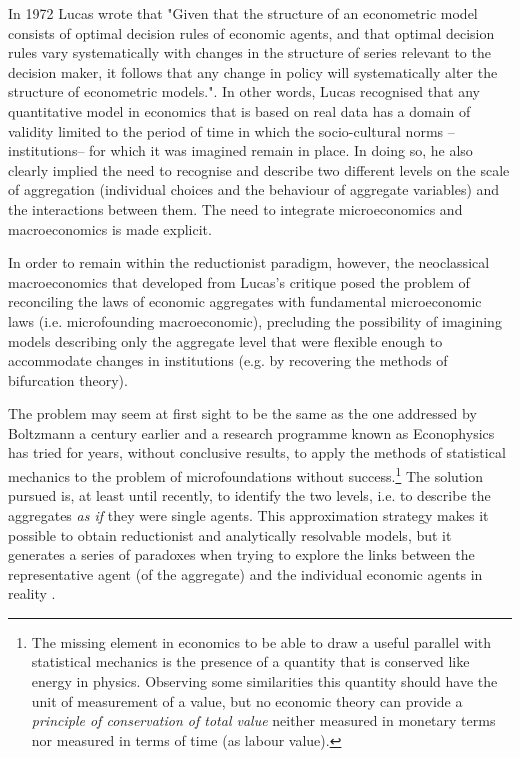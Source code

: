 \documentclass[a4paper, headings=standardclasses]{scrartcl}
\begin{document}
In 1972 Lucas wrote that "Given that the structure of an econometric model consists of optimal decision rules of economic agents, and that optimal decision rules vary systematically with changes in the structure of series relevant to the decision maker, it follows that any change in policy will systematically alter the structure of econometric models."\parencite{lucas1976}.
In other words, Lucas recognised that any quantitative model in economics that is based on real data has a domain of validity limited to the period of time in which the socio-cultural norms --institutions-- for which it was imagined remain in place.
In doing so, he also clearly implied the need to recognise and describe two different levels on the scale of aggregation (individual choices and the behaviour of aggregate variables) and the interactions between them. The need to integrate microeconomics and macroeconomics is made explicit.

In order to remain within the reductionist paradigm, however, the neoclassical macroeconomics that developed from Lucas's critique posed the problem of reconciling the laws of economic aggregates with fundamental microeconomic laws (i.e. microfounding macroeconomic), precluding the possibility of imagining models describing only the aggregate level that were flexible enough to accommodate changes in institutions (e.g. by recovering the methods of bifurcation theory).

The problem may seem at first sight to be the same as the one addressed by Boltzmann a century earlier and a research programme known as Econophysics has tried for years, without conclusive results, to apply the methods of statistical mechanics to the problem of microfoundations without success.\footnote{The missing element in economics to be able to draw a useful parallel with statistical mechanics is the presence of a quantity that is conserved like energy in physics. Observing some similarities this quantity should have the unit of measurement of a value, but no economic theory can provide a \textit{principle of conservation of total value} neither measured in monetary terms nor measured in terms of time (as labour value).}
The solution pursued is, at least until recently, to identify the two levels, i.e. to describe the aggregates \textit{as if} they were single agents. This approximation strategy makes it possible to obtain reductionist and analytically resolvable models, but it generates a series of paradoxes when trying to explore the links between the representative agent (of the aggregate) and the individual economic agents in reality \parencite{kirman1992}.
\end{document}
